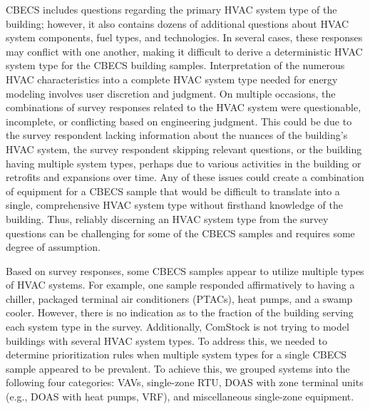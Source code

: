 CBECS includes questions regarding the primary HVAC system type of the building; however, it also contains dozens of additional questions about HVAC system components, fuel types, and technologies. In several cases, these responses may conflict with one another, making it difficult to derive a deterministic HVAC system type for the CBECS building samples. Interpretation of the numerous HVAC characteristics into a complete HVAC system type needed for energy modeling involves user discretion and judgment. On multiple occasions, the combinations of survey responses related to the HVAC system were questionable, incomplete, or conflicting based on engineering judgment. This could be due to the survey respondent lacking information about the nuances of the building's HVAC system, the survey respondent skipping relevant questions, or the building having multiple system types, perhaps due to various activities in the building or retrofits and expansions over time. Any of these issues could create a combination of equipment for a CBECS sample that would be difficult to translate into a single, comprehensive HVAC system type without firsthand knowledge of the building. Thus, reliably discerning an HVAC system type from the survey questions can be challenging for some of the CBECS samples and requires some degree of assumption.

Based on survey responses, some CBECS samples appear to utilize multiple types of HVAC systems. For example, one sample responded affirmatively to having a chiller, packaged terminal air conditioners (PTACs), heat pumps, and a swamp cooler. However, there is no indication as to the fraction of the building serving each system type in the survey. Additionally, ComStock is not trying to model buildings with several HVAC system types. To address this, we needed to determine prioritization rules when multiple system types for a single CBECS sample appeared to be prevalent. To achieve this, we grouped systems into the following four categories: VAVs, single-zone RTU, DOAS with zone terminal units (e.g., DOAS with heat pumps, VRF), and miscellaneous single-zone equipment.

